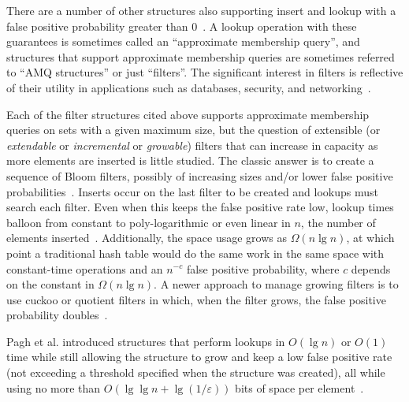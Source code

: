 \documentclass[letterpaper,twocolumn,10pt]{article}
\newcommand{\etal}{et al.}
\begin{document}
There are a number of other structures also supporting insert and lookup with a false positive probability greater than 0~\cite{vacuum,morton-journal,ribbon,xor-filter,quotient-filter,broom,vector-quotient}.
A lookup operation with these guarantees is sometimes called an ``approximate membership query'', and structures that support approximate membership queries are sometimes referred to ``AMQ structures'' or just ``filters''.
The significant interest in filters is reflective of their utility in applications such as databases, security, and networking~\cite{split-bloom, vacuum, quotient-filter, malware, profile-similarity, invertible, flooding-filter, summary-cache, prefix-matching-filter}.


Each of the filter structures cited above supports approximate membership queries on sets with a given maximum size, but the question of extensible (or {\itshape extendable} or {\itshape incremental} or {\itshape growable}) filters that can increase in capacity as more elements are inserted is little studied.
The classic answer is to create a sequence of Bloom filters, possibly of increasing sizes and/or lower false positive probabilities~\cite{dynamic-bloom,scalable-bloom}.
Inserts occur on the last filter to be created and lookups must search each filter.
Even when this keeps the false positive rate low, lookup times balloon from constant to poly-logarithmic or even linear in $n$, the number of elements inserted~\cite{psw,logarithm,consistent-cuckoo}. %
Additionally, the space usage grows as $\Omega(n \lg n)$, at which point a traditional hash table would do the same work in the same space with constant-time operations and an $n^{-c}$ false positive probability, where $c$ depends on the constant in $\Omega(n \lg n)$.
A newer approach to manage growing filters is to use cuckoo or quotient filters in which, when the filter grows, the false positive probability doubles~\cite{logarithm,morton-journal,vacuum,rsqf}.


Pagh \etal{} introduced structures that perform lookups in $O(\lg n)$ or $O(1)$ time while still allowing the structure to grow and keep a low false positive rate (not exceeding a threshold specified when the structure was created), all while using no more than $O(\lg \lg n + \lg (1/\varepsilon))$ bits of space per element~\cite{psw}.
\end{document}
